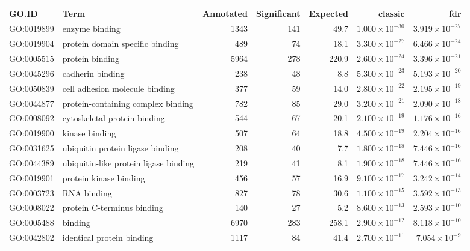 \begin{table}[ht]
\centering
\begin{tabular}{llrrrrr}
  \hline
GO.ID & Term & Annotated & Significant & Expected & classic & fdr \\ 
  \hline
GO:0019899 & enzyme binding & 1343 & 141 & 49.7 & $1.000 \times 10^{-30}$ & $3.919 \times 10^{-27}$ \\ 
  GO:0019904 & protein domain specific binding & 489 & 74 & 18.1 & $3.300 \times 10^{-27}$ & $6.466 \times 10^{-24}$ \\ 
  GO:0005515 & protein binding & 5964 & 278 & 220.9 & $2.600 \times 10^{-24}$ & $3.396 \times 10^{-21}$ \\ 
  GO:0045296 & cadherin binding & 238 & 48 & 8.8 & $5.300 \times 10^{-23}$ & $5.193 \times 10^{-20}$ \\ 
  GO:0050839 & cell adhesion molecule binding & 377 & 59 & 14.0 & $2.800 \times 10^{-22}$ & $2.195 \times 10^{-19}$ \\ 
  GO:0044877 & protein-containing complex binding & 782 & 85 & 29.0 & $3.200 \times 10^{-21}$ & $2.090 \times 10^{-18}$ \\ 
  GO:0008092 & cytoskeletal protein binding & 544 & 67 & 20.1 & $2.100 \times 10^{-19}$ & $1.176 \times 10^{-16}$ \\ 
  GO:0019900 & kinase binding & 507 & 64 & 18.8 & $4.500 \times 10^{-19}$ & $2.204 \times 10^{-16}$ \\ 
  GO:0031625 & ubiquitin protein ligase binding & 208 & 40 & 7.7 & $1.800 \times 10^{-18}$ & $7.446 \times 10^{-16}$ \\ 
  GO:0044389 & ubiquitin-like protein ligase binding & 219 & 41 & 8.1 & $1.900 \times 10^{-18}$ & $7.446 \times 10^{-16}$ \\ 
  GO:0019901 & protein kinase binding & 456 & 57 & 16.9 & $9.100 \times 10^{-17}$ & $3.242 \times 10^{-14}$ \\ 
  GO:0003723 & RNA binding & 827 & 78 & 30.6 & $1.100 \times 10^{-15}$ & $3.592 \times 10^{-13}$ \\ 
  GO:0008022 & protein C-terminus binding & 140 & 27 & 5.2 & $8.600 \times 10^{-13}$ & $2.593 \times 10^{-10}$ \\ 
  GO:0005488 & binding & 6970 & 283 & 258.1 & $2.900 \times 10^{-12}$ & $8.118 \times 10^{-10}$ \\ 
  GO:0042802 & identical protein binding & 1117 & 84 & 41.4 & $2.700 \times 10^{-11}$ & $7.054 \times 10^{-9}$ \\ 

\end{tabular}
\end{table}
